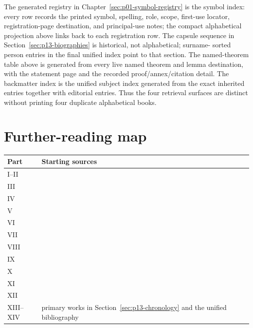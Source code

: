 The generated registry in Chapter~\ref{sec:p01-symbol-registry} is the symbol
index: every row records the printed symbol, spelling, role, scope, first-use
locator, registration-page destination, and principal-use notes; the compact
alphabetical projection above links back to each registration row. The capsule sequence in
Section~\ref{sec:p13-biographies} is historical, not alphabetical; surname-
sorted person entries in the final unified index point to that section. The
named-theorem table above is generated from every live named theorem and lemma
destination, with the statement page and the recorded proof/annex/citation
detail.
The backmatter index is the unified subject index generated from the exact
inherited entries together with editorial entries. Thus the four retrieval
surfaces are distinct without printing four duplicate alphabetical books.

\section{Further-reading map}
\label{sec:p14-further-reading}

\begin{tabularx}{\textwidth}{@{}l X@{}}
\toprule
Part & Starting sources \\
\midrule
I--II & \cite{Enderton2001,ChiswellHodges2007,OpenLogic2026} \\
III & \cite{Hodges1993,Marker2002,Marker2024} \\
IV & \cite{BoolosBurgessJeffrey2007,Shoenfield1967,AroraBarak2009} \\
V & \cite{Kaye1991,Boolos1993,Simpson2009} \\
VI & \cite{Jech2003,Kunen2011,Kanamori2003} \\
VII & \cite{TroelstraSchwichtenberg2000,Prawitz1965,GirardLafontTaylor1989} \\
VIII & \cite{BlackburnDeRijkeVenema2001,ChagrovZakharyaschev1997,Hajek1998} \\
IX & \cite{Libkin2004,BaaderHorrocksLutzSattler2017,ClarkeGrumbergPeled1999} \\
X & \cite{BurrisSankappanavar1981,Johnstone1982,MacLaneMoerdijk1992} \\
XI & \cite{Halbach2011,Keefe2000,BeallRestall2006} \\
XII & \cite{RobinsonVoronkov2001,SMTLIB2025,LeanManual2026} \\
XIII--XIV & primary works in Section~\ref{sec:p13-chronology} and the unified bibliography \\
\bottomrule
\end{tabularx}
